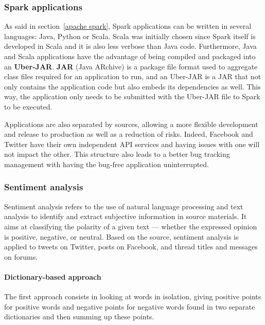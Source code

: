 \documentclass[11pt]{article}
\begin{document}
\subsubsection{Spark applications}

As said in section~\ref{apache spark}, \textsf{Spark} applications can be written in several languages: \textsf{Java}, \textsf{Python} or \textsf{Scala}. \textsf{Scala} was initially chosen since \textsf{Spark} itself is developed in \textsf{Scala} and it is also less verbose than \textsf{Java} code. Furthermore, \textsf{Java} and \textsf{Scala} applications have the advantage of being compiled and packaged into an \textsf{\textbf{Uber-JAR}}. \textsf{\textbf{JAR}} (\textsf{Java} ARchive) is a package file format used to aggregate class files required for an application to run, and an \textsf{Uber-JAR} is a \textsf{JAR} that not only contains the application code but also embeds its dependencies as well. This way, the application only needs to be submitted with the \textsf{Uber-JAR} file to \textsf{Spark} to be executed.

Applications are also separated by sources, allowing a more flexible development and release to production as well as a reduction of risks. Indeed, \textsf{Facebook} and \textsf{Twitter} have their own independent API services and having issues with one will not impact the other. This structure also leads to a better bug tracking management with having the bug-free application uninterrupted.

\subsubsection{Sentiment analysis}

Sentiment analysis refers to the use of natural language processing and text analysis to identify and extract subjective information in source materials. It aims at classifying the polarity of a given text — whether the expressed opinion is positive, negative, or neutral.
Based on the source, sentiment analysis is applied to tweets on \textsf{Twitter}, posts on \textsf{Facebook}, and thread titles and messages on forums.

\paragraph{Dictionary-based approach}

The first approach consists in looking at words in isolation, giving positive points for positive words and negative points for negative words found in two separate dictionaries and then summing up these points.
\vspace{9pt}
\end{document}
